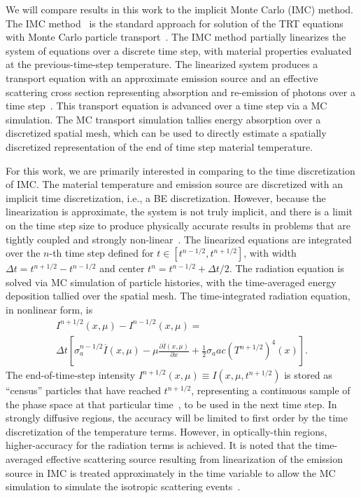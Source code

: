 \documentclass{anstrans}
\newcommand{\pderiv}[2]{\frac{\partial #1}{\partial #2}}
\begin{document}
We will compare results in this work to the implicit Monte Carlo (IMC) method.  The IMC
method~\cite{fnc} is the standard approach for solution of the TRT equations with Monte Carlo particle
transport~\cite{wollaber_review}.  The IMC method partially linearizes the system of equations over
a discrete time step, with material properties evaluated at the previous-time-step temperature. The
linearized system produces a transport equation with an approximate emission source and an effective scattering cross section representing
absorption and re-emission of photons over a time step~\cite{fnc}. This transport equation is advanced over a
time step via a MC simulation.   The MC transport simulation tallies energy absorption over a discretized spatial mesh,
which can be used to directly estimate a spatially discretized representation of the end of time step material temperature.

For this work, we are primarily interested in comparing to the time discretization of IMC.
The material temperature and emission source are discretized with an implicit time discretization,
i.e., a BE discretization.  However, because the linearization is approximate, the system is not
truly implicit, and there is a limit on the time step size to produce physically accurate
results in problems that are tightly coupled and strongly non-linear~\cite{wollaber2013discrete}. 
The linearized equations are integrated over the $n$-th time step defined for
$t\in[t^{n-1/2},t^{n+1/2}]$, with width $\Delta t=t^{n+1/2}-t^{n-1/2}$ and center $t^{n}=t^{n-1/2} +
\Delta t/2$. The radiation equation is solved via MC simulation of particle histories, with the time-averaged
energy deposition tallied over the spatial mesh.    The time-integrated radiation equation, in nonlinear form, is
\begin{multline}
I^{n+1/2}(x,\mu) - I^{n-1/2}(x,\mu) = \\ \Delta t \left[\sigma_a^{n-1/2} \overline{I}(x,\mu) - {\mu
\pderiv{\overline{I}(x,\mu)}{x}} 
+\frac{1}{2} \sigma_a a c \left(T^{n+1/2}\right)^{4}(x) \right].
\end{multline}
The end-of-time-step intensity $I^{n+1/2}(x,\mu)\equiv I(x,\mu,t^{n+1/2})$ is stored as ``census''
particles that have reached $t^{n+1/2}$,
representing a continuous sample of the phase space at that particular time~\cite{fnc}, to be used in the next
time step.  In strongly diffusive regions, the accuracy will be limited to first
order by the time discretization of the temperature terms.  However, in optically-thin regions, higher-accuracy for the 
radiation terms is achieved.
It is noted that the time-averaged effective scattering source resulting from
linearization of the emission source in IMC is treated approximately in the time variable to allow
the MC simulation to simulate the isotropic scattering events~\cite{wollaber_review,fnc}.
\end{document}
